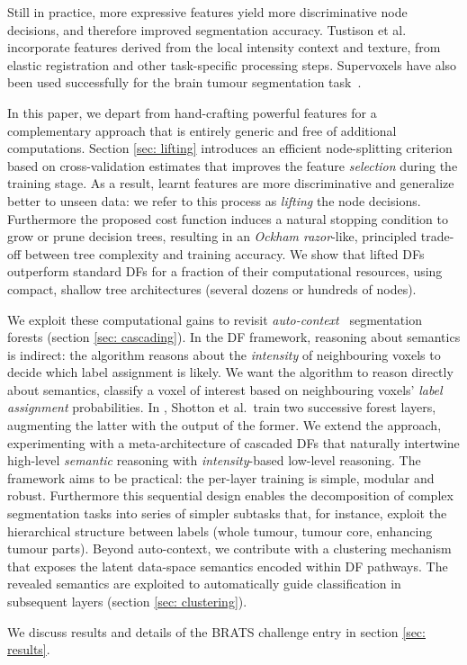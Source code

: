 Still in practice, more expressive features yield more
discriminative node decisions, and therefore %
improved segmentation accuracy. Tustison et al.~\cite{tustison2013ants,tustison2015optimal} incorporate features derived from the local intensity context and texture, from elastic registration and other task-specific processing steps. Supervoxels have also been used successfully for the brain tumour segmentation task~\cite{geremia2013spatially}. 

In this paper, we depart from hand-crafting powerful features for a complementary approach that is entirely generic and free of additional computations. Section \ref{sec: lifting} introduces an efficient node-splitting criterion based on cross-validation estimates that improves the feature \textit{selection} during the training stage. As a result, learnt features are more discriminative and generalize better to unseen data: we refer to this process as \textit{lifting} the node decisions. 
Furthermore the proposed cost function induces a natural stopping condition to grow or prune decision trees, %
resulting in an \textit{Ockham razor}-like, principled trade-off between tree complexity and training accuracy. %
We show that lifted DFs outperform standard DFs for a fraction of their computational resources, using compact, shallow tree architectures (several dozens or hundreds of nodes). 

We exploit these computational gains to revisit \textit{auto-context}~\cite{tu2008auto,tu2010auto} segmentation forests (section \ref{sec: cascading}). In the DF framework, reasoning about semantics is indirect: the algorithm reasons about the \textit{intensity} of neighbouring voxels to decide which label assignment is likely. We want the algorithm to reason directly about semantics, \eg classify a voxel of interest based on neighbouring voxels' \textit{label assignment} probabilities. In \cite{shotton2008semantic}, Shotton et al.~train two successive forest layers, augmenting the latter with the output of the former. We extend the approach, experimenting with a meta-architecture of cascaded DFs that naturally intertwine high-level \textit{semantic} reasoning with \textit{intensity}-based low-level reasoning. The framework aims to be practical: the per-layer training is simple, modular and robust. Furthermore this sequential design enables the 
decomposition of complex segmentation tasks into series of simpler subtasks that, for instance, exploit the hierarchical structure between labels (\eg whole tumour, tumour core, enhancing tumour parts). Beyond auto-context, we contribute with a clustering mechanism that exposes the latent data-space semantics encoded within DF pathways. The revealed semantics are exploited to automatically guide classification in subsequent layers (section \ref{sec: clustering}). 

We discuss results and details of the BRATS challenge entry in section \ref{sec: results}.



